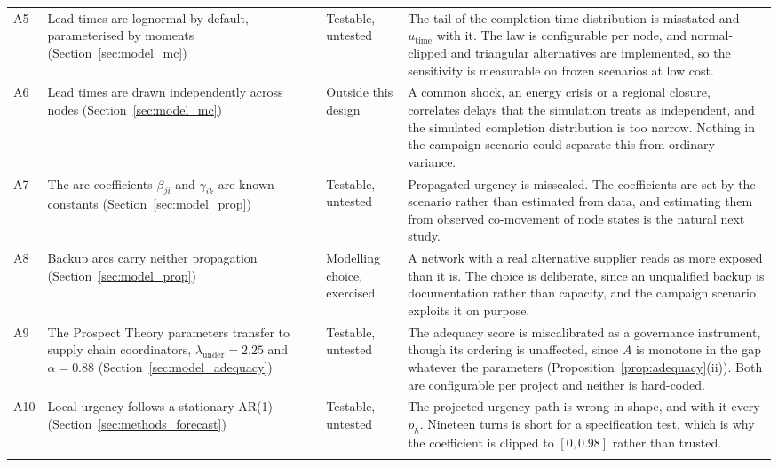 \begin{longtable}{@{}p{0.5cm} p{4.1cm} p{2.0cm} p{7.6cm}@{}}
A5 & Lead times are lognormal by default, parameterised by moments
(Section~\ref{sec:model_mc})
& Testable, untested
& The tail of the completion-time distribution is misstated and $u_{\text{time}}$ with it.
The law is configurable per node, and normal-clipped and triangular alternatives are
implemented, so the sensitivity is measurable on frozen scenarios at low cost. \\
\addlinespace

A6 & Lead times are drawn independently across nodes
(Section~\ref{sec:model_mc})
& Outside this design
& A common shock, an energy crisis or a regional closure, correlates delays that the
simulation treats as independent, and the simulated completion distribution is too narrow.
Nothing in the campaign scenario could separate this from ordinary variance. \\
\addlinespace

A7 & The arc coefficients $\beta_{ji}$ and $\gamma_{ik}$ are known constants
(Section~\ref{sec:model_prop})
& Testable, untested
& Propagated urgency is misscaled. The coefficients are set by the scenario rather than
estimated from data, and estimating them from observed co-movement of node states is the
natural next study. \\
\addlinespace

A8 & Backup arcs carry neither propagation
(Section~\ref{sec:model_prop})
& Modelling choice, exercised
& A network with a real alternative supplier reads as more exposed than it is. The choice is
deliberate, since an unqualified backup is documentation rather than capacity, and the
campaign scenario exploits it on purpose. \\
\addlinespace

A9 & The Prospect Theory parameters transfer to supply chain coordinators,
$\lambda_{\text{under}} = 2.25$ and $\alpha = 0.88$
(Section~\ref{sec:model_adequacy})
& Testable, untested
& The adequacy score is miscalibrated as a governance instrument, though its ordering is
unaffected, since $A$ is monotone in the gap whatever the parameters
(Proposition~\ref{prop:adequacy}(ii)). Both are configurable per project and neither is
hard-coded. \\
\addlinespace

A10 & Local urgency follows a stationary AR(1)
(Section~\ref{sec:methods_forecast})
& Testable, untested
& The projected urgency path is wrong in shape, and with it every $p_h$. Nineteen turns is
short for a specification test, which is why the coefficient is clipped to $[0,0.98]$ rather
than trusted. \\
\addlinespace


\end{longtable}
